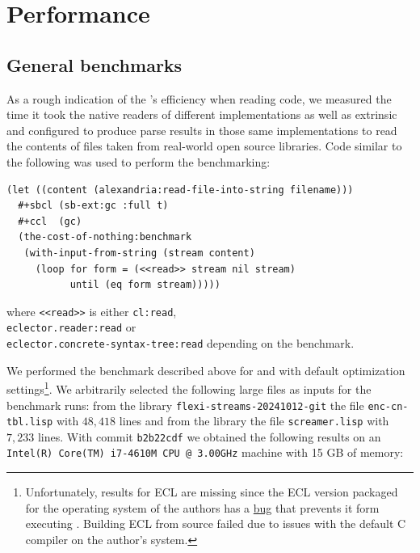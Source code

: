 \section{Performance}
\label{sec-performance}

\subsection{General benchmarks}
\label{sec:benchmarks}

As a rough indication of the \eclector{}'s efficiency when reading
\cl{} code, we measured the time it took the native readers of
different \cl{} implementations as well as extrinsic \eclector{} and
\eclector{} configured to produce parse results in those same
implementations to read the contents of \cl{} files taken from
real-world open source libraries.  Code similar to the following was
used to perform the benchmarking:%
%
\begin{listing}[H]
\begin{verbatim}
(let ((content (alexandria:read-file-into-string filename)))
  #+sbcl (sb-ext:gc :full t)
  #+ccl  (gc)
  (the-cost-of-nothing:benchmark
   (with-input-from-string (stream content)
     (loop for form = (<<read>> stream nil stream)
           until (eq form stream)))))
\end{verbatim}
\end{listing}
%
\vspace{-2em} \noindent where \texttt{<<read>>} is either
\texttt{cl:read},\\
\texttt{eclector.reader:read} or\\
\texttt{eclector.concrete-syntax-tree:read} depending on the
benchmark.

We performed the benchmark described above for \sbcl{} and \ccl{} with
default optimization settings\footnote{Unfortunately, results for ECL
  are missing since the ECL version packaged for the operating system
  of the authors has a
  \href{https://gitlab.com/embeddable-common-lisp/ecl/-/issues/802}{bug}
  that prevents it form executing \eclector{}.  Building ECL from
  source failed due to issues with the default C compiler on the
  author's system.}.  We arbitrarily selected the following large
\cl{} files as inputs for the benchmark runs: from the library
\texttt{flexi-streams-20241012-git} the file \texttt{enc-cn-tbl.lisp}
with $48,418$ lines and from the library 
the file \texttt{screamer.lisp} with $7,233$ lines.  With \eclector{}
commit \texttt{b2b22cdf} we obtained the following results on an
\texttt{Intel(R) Core(TM) i7-4610M CPU @ 3.00GHz} machine with 15 GB
of memory:

